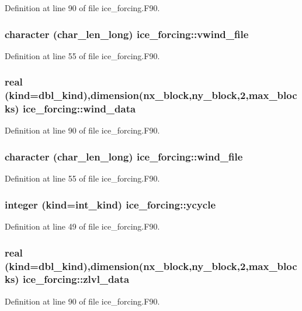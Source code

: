 Definition at line 90 of file ice\_\-forcing.F90.\hypertarget{namespaceice__forcing_a81253ba2712f47539e7e4f1d0d35d885}{
\subsubsection[{vwind\_\-file}]{\setlength{\rightskip}{0pt plus 5cm}character (char\_\-len\_\-long) {\bf ice\_\-forcing::vwind\_\-file}}}
\label{namespaceice__forcing_a81253ba2712f47539e7e4f1d0d35d885}


Definition at line 55 of file ice\_\-forcing.F90.\hypertarget{namespaceice__forcing_a5b562d2a30773faba85cbae322e64162}{
\subsubsection[{wind\_\-data}]{\setlength{\rightskip}{0pt plus 5cm}real (kind=dbl\_\-kind),dimension(nx\_\-block,ny\_\-block,2,max\_\-blocks) {\bf ice\_\-forcing::wind\_\-data}}}
\label{namespaceice__forcing_a5b562d2a30773faba85cbae322e64162}


Definition at line 90 of file ice\_\-forcing.F90.\hypertarget{namespaceice__forcing_a096f17ea955001c7c2f968e84e0bf5b5}{
\subsubsection[{wind\_\-file}]{\setlength{\rightskip}{0pt plus 5cm}character (char\_\-len\_\-long) {\bf ice\_\-forcing::wind\_\-file}}}
\label{namespaceice__forcing_a096f17ea955001c7c2f968e84e0bf5b5}


Definition at line 55 of file ice\_\-forcing.F90.\hypertarget{namespaceice__forcing_a50c7cbc293e8bdff5e53f79b141e4a9b}{
\subsubsection[{ycycle}]{\setlength{\rightskip}{0pt plus 5cm}integer (kind=int\_\-kind) {\bf ice\_\-forcing::ycycle}}}
\label{namespaceice__forcing_a50c7cbc293e8bdff5e53f79b141e4a9b}


Definition at line 49 of file ice\_\-forcing.F90.\hypertarget{namespaceice__forcing_ad17a564b4d1aff388f9e96432340e0f8}{
\subsubsection[{zlvl\_\-data}]{\setlength{\rightskip}{0pt plus 5cm}real (kind=dbl\_\-kind),dimension(nx\_\-block,ny\_\-block,2,max\_\-blocks) {\bf ice\_\-forcing::zlvl\_\-data}}}
\label{namespaceice__forcing_ad17a564b4d1aff388f9e96432340e0f8}


Definition at line 90 of file ice\_\-forcing.F90.